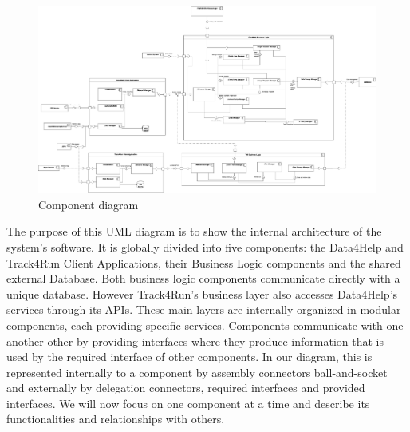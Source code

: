 \documentclass[titlepage]{article}
\begin{document}
\begin{figure}[H]
	\center
  	\includegraphics[width=15cm]{ComponentDiagram.png}
  	\caption{Component diagram}
 	\label{fig:COMPDIA}
\end{figure}

The purpose of this UML diagram is to show the internal architecture of the system’s software. It is globally divided into five components: the Data4Help and Track4Run Client Applications, their Business Logic components and the shared external Database. Both business logic components communicate directly with a unique database. However Track4Run’s business layer also accesses Data4Help’s services through its APIs. These main layers are internally organized in modular components, each providing specific services. 
Components communicate with one another other by providing interfaces where they produce information that is used by the required interface of other components. In our diagram, this is represented internally to a component by assembly connectors ball-and-socket and externally by delegation connectors, required interfaces and provided interfaces.
We will now focus on one component at a time and describe its functionalities and relationships with others. \\ 
\end{document}
